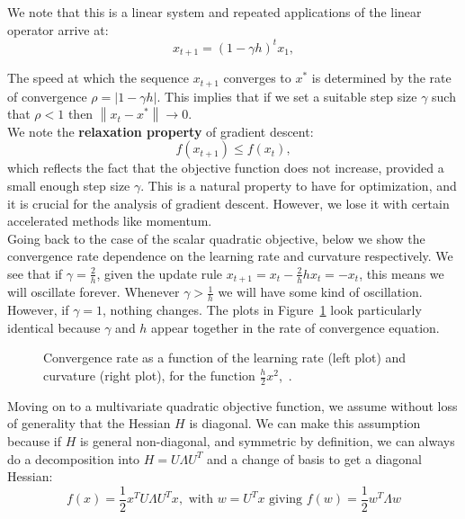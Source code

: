\documentclass{article}
\newcommand\norm[1]{\left\lVert#1\right\rVert}
\begin{document}
We note that this is a linear system and repeated applications of the linear operator arrive at:
\begin{equation}
	x_{t+1} =(1 - \gamma h)^t x_1,
\end{equation}

The speed at which the sequence $x_{t+1}$ converges to $x^*$ is determined by the rate of convergence $\rho = |1 - \gamma h|$. This implies that if we set a suitable step size $\gamma$ such that $\rho < 1$ then $\norm{x_t - x^*} \rightarrow 0$.
\\

We note the \textbf{relaxation property} of gradient descent:
\begin{equation}
	f(x_{t+1}) \leq f(x_t),
\end{equation}
which reflects the fact that the objective function does not increase, provided a small enough step size $\gamma$. This is a natural property to have for optimization, and it is crucial for the analysis of gradient descent. However, we lose it with certain accelerated methods like momentum.
\\

Going back to the case of the scalar quadratic objective, below we show the convergence rate dependence on the learning rate and curvature respectively. 
We see that if $\gamma = \frac{2}{h}$, given the update rule $x_{t+1} = x_t - \frac{2}{h} h x_t = -x_t$, this means we will oscillate forever. Whenever $\gamma > \frac{1}{h}$ we will have some kind of oscillation. However, if $\gamma = 1$, nothing changes. The plots in Figure~\ref{fig:convergence-plots} look particularly identical because $\gamma$ and $h$ appear together in the rate of convergence equation.

\begin{figure}[H]%
\centering
{}%
\qquad
{}%
\caption{Convergence rate as a function of the learning rate (left plot) and curvature (right plot), for the function $\frac{h}{2}x^2$,~\cite{mitliagkas2019interesting}.}
\label{fig:convergence-plots}
\end{figure}

Moving on to a multivariate quadratic objective function, we assume without loss of generality that the Hessian $H$ is diagonal.
We can make this assumption because if $H$ is general non-diagonal, and symmetric by definition, we can always do a decomposition into $H = U\Lambda U^T$ and a change of basis to get a diagonal Hessian:
\begin{equation}
    f(x) = \frac{1}{2} x^T U \Lambda U^T x, \text{ with } w=U^T x \text{ giving } f(w) = \frac{1}{2} w^T \Lambda w
\end{equation}
\end{document}
